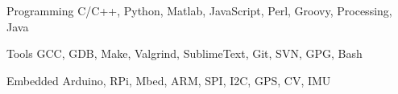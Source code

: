 

\begin{cvskills}

  \cvskill
    {Programming} %
    {C/C++, Python, Matlab, JavaScript, Perl, Groovy, Processing, Java} %

  \cvskill
    {Tools} %
    {GCC, GDB, Make, Valgrind, SublimeText, Git, SVN, GPG, Bash} %

  \cvskill
    {Embedded} %
    {Arduino, RPi, Mbed, ARM, SPI, I2C, GPS, CV, IMU} %

\end{cvskills}
